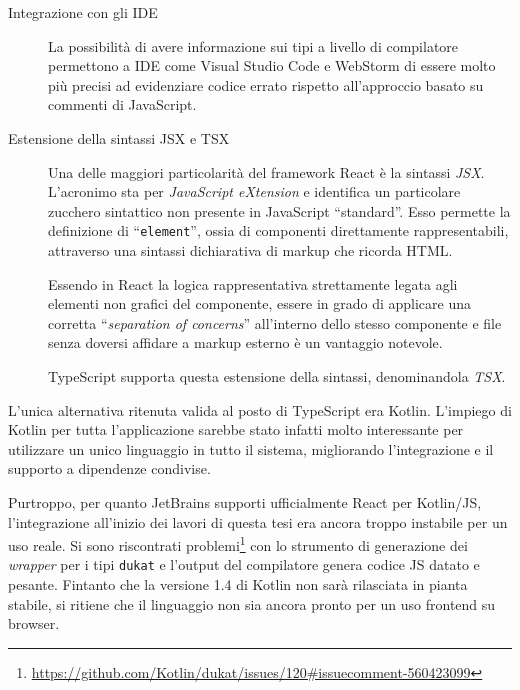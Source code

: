 \begin{description}
        \item[Integrazione con gli IDE]
          La possibilità di avere informazione sui tipi a livello di compilatore permettono a IDE come Visual Studio Code e WebStorm di essere molto più precisi ad evidenziare codice errato rispetto all'approccio basato su commenti di JavaScript.

        \item[Estensione della sintassi JSX e TSX]
          Una delle maggiori particolarità del framework React è la sintassi \emph{JSX}\@.
          L'acronimo sta per \emph{\emph{J}ava\emph{S}cript e\emph{X}tension} e identifica un particolare zucchero sintattico non presente in JavaScript ``standard''.
          Esso permette la definizione di ``\texttt{element}'', ossia di componenti direttamente rappresentabili, attraverso una sintassi dichiarativa di markup che ricorda HTML\@.

          Essendo in React la logica rappresentativa strettamente legata agli elementi non grafici del componente,
          essere in grado di applicare una corretta ``\emph{separation of concerns}''
          all'interno dello stesso componente e file senza doversi affidare a markup esterno è un vantaggio notevole.

          TypeScript supporta questa estensione della sintassi, denominandola \emph{TSX}.

      \end{description}

      L'unica alternativa ritenuta valida al posto di TypeScript era Kotlin.
      L'impiego di Kotlin per tutta l'applicazione sarebbe stato infatti molto interessante per utilizzare un unico linguaggio in tutto il sistema, migliorando l'integrazione e il supporto a dipendenze condivise.

      Purtroppo, per quanto JetBrains supporti ufficialmente React per Kotlin/JS, l'integrazione all'inizio dei lavori di questa tesi era ancora troppo instabile per un uso reale.
      Si sono riscontrati problemi\footnote{\url{https://github.com/Kotlin/dukat/issues/120\#issuecomment-560423099}} con lo strumento di generazione dei \emph{wrapper} per i tipi \texttt{dukat} e l'output del compilatore genera codice JS datato e pesante.
      Fintanto che la versione 1.4 di Kotlin non sarà rilasciata in pianta stabile, si ritiene che il linguaggio non sia ancora pronto per un uso frontend su browser.

